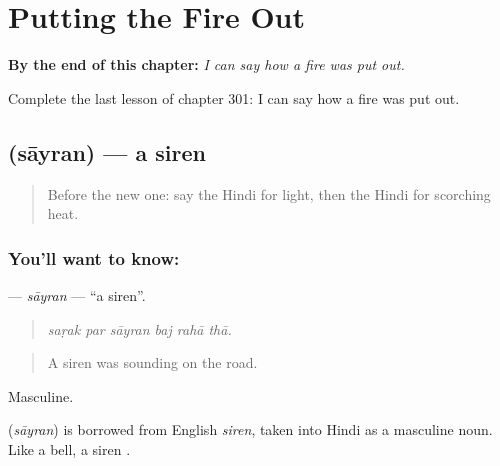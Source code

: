 
\chapter{Putting the Fire Out}
\label{ch:hi-putting-the-fire-out}

\begin{chapteropening}
\textbf{By the end of this chapter:} \emph{I can say how a fire was put out.}

Complete the last lesson of chapter 301: I can say how a fire was put out.
\end{chapteropening}

\section[\texorpdfstring{\hi{सायरन} (sāyran)}{सायरन (sāyran)}]{ (sāyran) — a siren}

\label{lesson:HI-C301-sayran}



\begin{quote}
Before the new one: say the Hindi for light, then the Hindi for scorching heat.
\end{quote}

\subsection*{You'll want to know: }
\textbf{} — \emph{sāyran} — \textquotedblleft{}a siren\textquotedblright{}.

\begin{quote}
     
\end{quote}

\begin{quote}
\emph{saṛak par sāyran baj rahā thā.}
\end{quote}

\begin{quote}
A siren was sounding on the road.
\end{quote}

Masculine.

\begin{cousinweb}
\textbf{} (\emph{sāyran}) is borrowed from English \emph{siren}, taken into Hindi as a masculine noun. Like a bell, a siren \textbf{ }.
\end{cousinweb}

